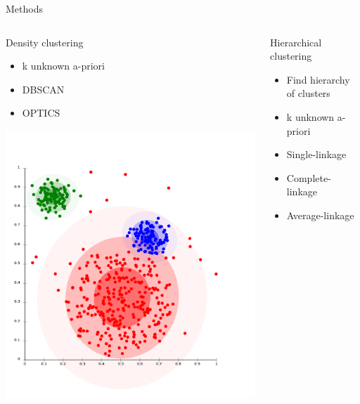 \documentclass{beamer}\usepackage[]{graphicx}\usepackage[]{color}
\begin{document}
\begin{frame}[fragile]{Methods}
\begin{columns}[t]
\begin{column}{.32\linewidth}
\begin{block}{Density clustering}
\begin{itemize}
          \item k unknown a-priori
          \item DBSCAN
          \item OPTICS
        \end{itemize}
        \begin{center}
          \includegraphics[width=\linewidth]{clust_dens.png}
        \end{center}
      \end{block}
    \end{column}
    \begin{column}{.32\linewidth}
      \begin{block}{Hierarchical clustering}
        \begin{itemize}
          \item Find hierarchy of clusters
          \item k unknown a-priori
          \item Single-linkage
          \item Complete-linkage
          \item Average-linkage
        \end{itemize}
        \begin{center}

\end{center}
\end{block}
\end{column}
\end{columns}
\end{frame}
\end{document}
